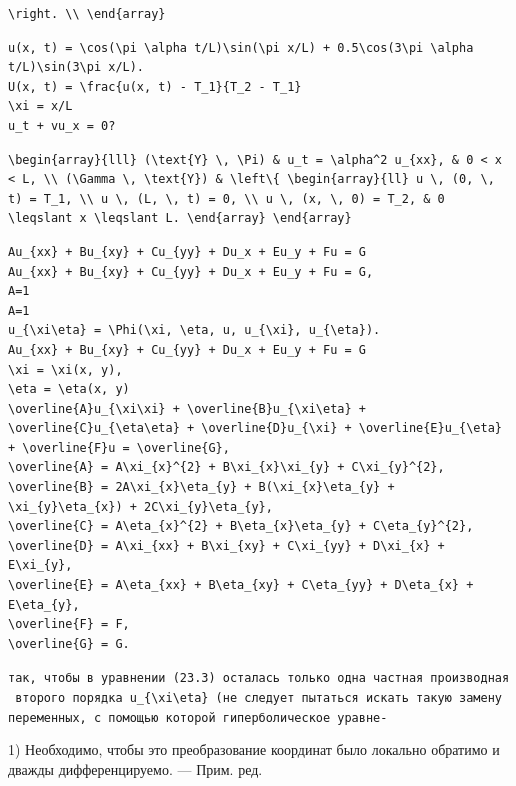 \documentclass[
  ukrainian,
]{article}
\begin{document}
\begin{verbatim}
\right. \\ \end{array}
\end{verbatim}

\begin{verbatim}
u(x, t) = \cos(\pi \alpha t/L)\sin(\pi x/L) + 0.5\cos(3\pi \alpha t/L)\sin(3\pi x/L).
U(x, t) = \frac{u(x, t) - T_1}{T_2 - T_1}
\xi = x/L
u_t + vu_x = 0?
\end{verbatim}

\begin{verbatim}
\begin{array}{lll} (\text{Y} \, \Pi) & u_t = \alpha^2 u_{xx}, & 0 < x < L, \\ (\Gamma \, \text{Y}) & \left\{ \begin{array}{ll} u \, (0, \, t) = T_1, \\ u \, (L, \, t) = 0, \\ u \, (x, \, 0) = T_2, & 0 \leqslant x \leqslant L. \end{array} \end{array}
\end{verbatim}

\begin{verbatim}
Au_{xx} + Bu_{xy} + Cu_{yy} + Du_x + Eu_y + Fu = G
Au_{xx} + Bu_{xy} + Cu_{yy} + Du_x + Eu_y + Fu = G,
A=1
A=1
u_{\xi\eta} = \Phi(\xi, \eta, u, u_{\xi}, u_{\eta}).
Au_{xx} + Bu_{xy} + Cu_{yy} + Du_x + Eu_y + Fu = G
\xi = \xi(x, y),
\eta = \eta(x, y)
\overline{A}u_{\xi\xi} + \overline{B}u_{\xi\eta} + \overline{C}u_{\eta\eta} + \overline{D}u_{\xi} + \overline{E}u_{\eta} + \overline{F}u = \overline{G},
\overline{A} = A\xi_{x}^{2} + B\xi_{x}\xi_{y} + C\xi_{y}^{2},
\overline{B} = 2A\xi_{x}\eta_{y} + B(\xi_{x}\eta_{y} + \xi_{y}\eta_{x}) + 2C\xi_{y}\eta_{y},
\overline{C} = A\eta_{x}^{2} + B\eta_{x}\eta_{y} + C\eta_{y}^{2},
\overline{D} = A\xi_{xx} + B\xi_{xy} + C\xi_{yy} + D\xi_{x} + E\xi_{y},
\overline{E} = A\eta_{xx} + B\eta_{xy} + C\eta_{yy} + D\eta_{x} + E\eta_{y},
\overline{F} = F,
\overline{G} = G.
\end{verbatim}

\texttt{так,\ чтобы\ в\ уравнении\ (23.3)\ осталась\ только\ одна\ частная\ производная\ второго\ порядка\ \textquotesingle{}u\_\{\textbackslash{}xi\textbackslash{}eta\}\textquotesingle{}\ (не\ следует\ пытаться\ искать\ такую\ замену\ переменных,\ с\ помощью\ которой\ гиперболическое\ уравне-}

1) Необходимо, чтобы это преобразование координат было локально обратимо
и дважды дифференцируемо. --- Прим. ред.
\end{document}
